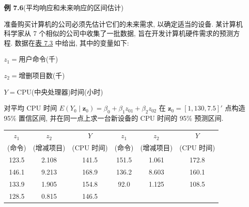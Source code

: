 \noindent\textbf{例 7.6}\quad (平均响应和未来响应的区间估计)

准备购买计算机的公司必须先估计它们的未来需求, 以确定适当的设备. 某计算机科学家从 7 个相似的公司中收集了一批数据, 旨在开发计算机硬件需求的预测方程. 数据在\hyperref[tab:7.3]{表 7.3} 中给出, 其中的变量如下:

$z_1=$用户命令(千)

$z_2=$增删项目数(千)

$Y=$CPU(中央处理器)时间(小时)

对平均 CPU 时间 $E(Y_0\mid\mathbf{z}_0)=\beta_0+\beta_1z_{01}+\beta_2z_{02}$ 在 $\mathbf{z}_0=[1,130,7.5]'$ 点构造 95\% 置信区间, 并在同一点上求一台新设备的 CPU 时间的 95\% 预测区间.

\begin{mvtable}
\label{tab:7.3}
\begin{tabular}{ccc|ccc}
\toprule
$z_1$ & $z_2$ & $Y$ & $z_1$ & $z_2$ & $Y$\\
(命令) & (增减项目) & (CPU 时间) & (命令) & (增减项目) & (CPU 时间)\\
\midrule
123.5 & 2.108 & 141.5 & 151.5 & 1.061 & 172.8\\
146.1 & 9.213 & 168.9 & 136.2 & 8.603 & 160.1\\
133.9 & 1.905 & 154.8 & 92.0 & 1.125 & 108.5\\
128.5 & 0.815 & 146.5 & & &\\
\bottomrule
\end{tabular}
\end{mvtable}
